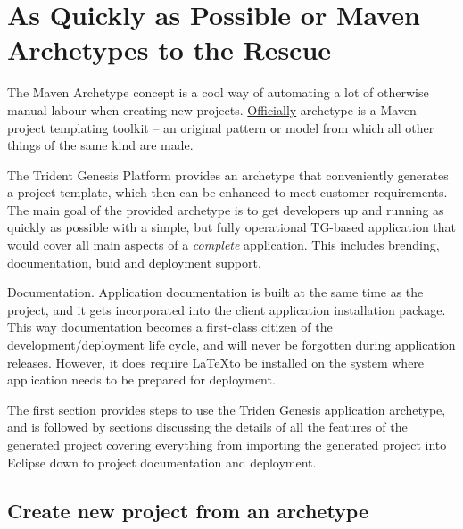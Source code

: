 \chapter{As Quickly as Possible or Maven Archetypes to the Rescue}\label{ch00:02}

  The Maven Archetype concept is a cool way of automating a lot of otherwise manual labour when creating new projects.
  \href{http://maven.apache.org/guides/introduction/introduction-to-archetypes.html}{Officially} archetype is a Maven project templating toolkit -- an original pattern or model from which all other things of the same kind are made.

  The Trident Genesis Platform provides an archetype that conveniently generates a project template, which then can be enhanced to meet customer requirements.
  The main goal of the provided archetype is to get developers up and running as quickly as possible with a simple, but fully operational TG-based application that would cover all main aspects of a \emph{complete} application.
  This includes brending, documentation, buid and deployment support.
  
  \begin{notebox}{Documentation.}{\label{mb:documentation-during-build}}
    Application documentation is built at the same time as the project, and it gets incorporated into the client application installation package.
    This way documentation becomes a first-class citizen of the development/deployment life cycle, and will never be forgotten during application releases.
    However, it does require \LaTeX to be installed on the system where application needs to be prepared for deployment.
  \end{notebox}

  The first section provides steps to use the Triden Genesis application archetype, and is followed by sections discussing the details of all the features of the generated project covering everything from importing the generated project into Eclipse down to project documentation and deployment.

\section{Create new project from an archetype}

